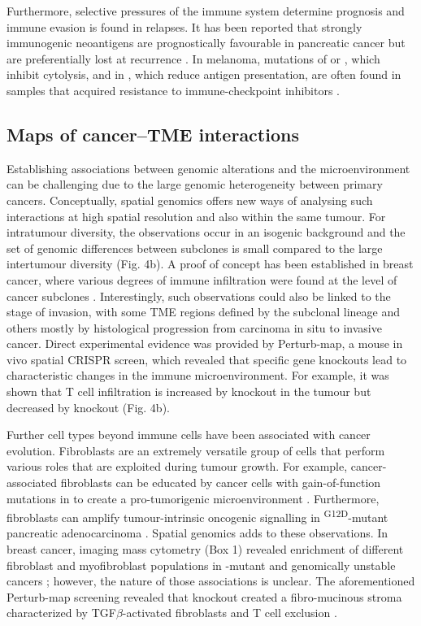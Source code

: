 Furthermore, selective pressures of the immune system determine prognosis and immune evasion is found in relapses. It has been reported that strongly immunogenic neoantigens are prognostically favourable in pancreatic cancer \parencite{Balachandran2017-zq} but are preferentially lost at recurrence \parencite{Luksza2022-jj}. In melanoma, mutations of  or , which inhibit cytolysis, and in , which reduce antigen presentation, are often found in samples that acquired resistance to immune-checkpoint inhibitors \parencite{Sade-Feldman2017-mj,Zaretsky2016-rs}.

\subsection*{Maps of cancer–\ac{TME} interactions}

Establishing associations between genomic alterations and the microenvironment can be challenging due to the large genomic heterogeneity between primary cancers. Conceptually, spatial genomics offers new ways of analysing such interactions at high spatial resolution and also within the same tumour. For intratumour diversity, the observations occur in an isogenic background and the set of genomic differences between subclones is small compared to the large intertumour diversity (Fig. 4b). A proof of concept has been established in breast cancer, where various degrees of immune infiltration were found at the level of cancer subclones \parencite{Lomakin2022-ks}. Interestingly, such observations could also be linked to the stage of invasion, with some \ac{TME} regions defined by the subclonal lineage and others mostly by histological progression from carcinoma in situ to invasive cancer. Direct experimental evidence was provided by Perturb-map, a mouse in vivo spatial CRISPR screen, which revealed that specific gene knockouts lead to characteristic changes in the immune microenvironment. For example, it was shown that T cell infiltration is increased by  knockout in the tumour but decreased by  knockout \parencite{Dhainaut2022-nj} (Fig. 4b).

Further cell types beyond immune cells have been associated with cancer evolution. Fibroblasts are an extremely versatile group of cells that perform various roles that are exploited during tumour growth. For example, cancer-associated fibroblasts can be educated by cancer cells with gain-of-function mutations in  to create a pro-tumorigenic microenvironment \parencite{Vennin2019-cf}. Furthermore, fibroblasts can amplify tumour-intrinsic oncogenic signalling in \textsuperscript{G12D}-mutant pancreatic adenocarcinoma \parencite{Tape2016-hb}. Spatial genomics adds to these observations. In breast cancer, imaging mass cytometry (Box 1) revealed enrichment of different fibroblast and myofibroblast populations in -mutant and genomically unstable cancers \parencite{Ali2020-zo}; however, the nature of those associations is unclear. The aforementioned Perturb-map screening revealed that  knockout created a fibro-mucinous stroma characterized by TGF$\beta$-activated fibroblasts and T cell exclusion \parencite{Dhainaut2022-nj}.

